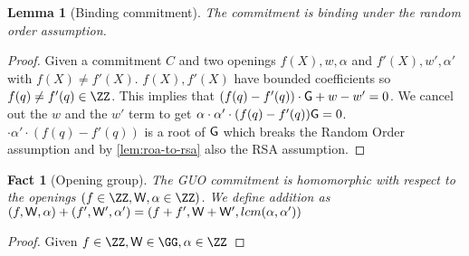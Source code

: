 \documentclass[12pt]{article}
\theoremstyle{Definition}
\newtheorem{lemma}{Lemma}
\newtheorem{fact}{Fact}
\begin{document}
\begin{lemma}[Binding commitment]
\label{lem:aug-com-binding}
	The commitment is binding under the random order assumption. 
\end{lemma}
\begin{proof}
	Given a commitment $C$ and two openings $f(X),w,\alpha$ and $f'(X),w',\alpha'$ with $f(X)\neq f'(X)$. $f(X),f'(X)$ have bounded coefficients so $f(q)\neq f'(q)\in \ZZ$. This implies that $(f(q)-f'(q))\cdot \mathsf{G}+w-w'=0$. 
	We cancel out the $w$ and the $w'$ term to get $\alpha\cdot \alpha'\cdot (f(q)-f'(q)) \mathsf{G}=0$. $\cdot \alpha'\cdot (f(q)-f'(q))$ is a root of $\mathsf{G}$ 
	which breaks the Random Order assumption and by \cref{lem:roa-to-rsa} also the RSA assumption.
	\end{proof}
	\begin{fact}[Opening group]
		The GUO commitment is homomorphic with respect to the openings $(f \in \ZZ,\gr{W},\alpha \in \ZZ)$. We define addition as $(f,\mathsf{W},\alpha)+	(f',\mathsf{W}',\alpha')=(f+f',\mathsf{W}+\mathsf{W}',lcm(\alpha,\alpha'))$ \end{fact}
	\begin{proof}
		Given $f \in \ZZ,\gr{W} \in \GG, \alpha \in \ZZ$
	\end{proof}
	
\end{document}
